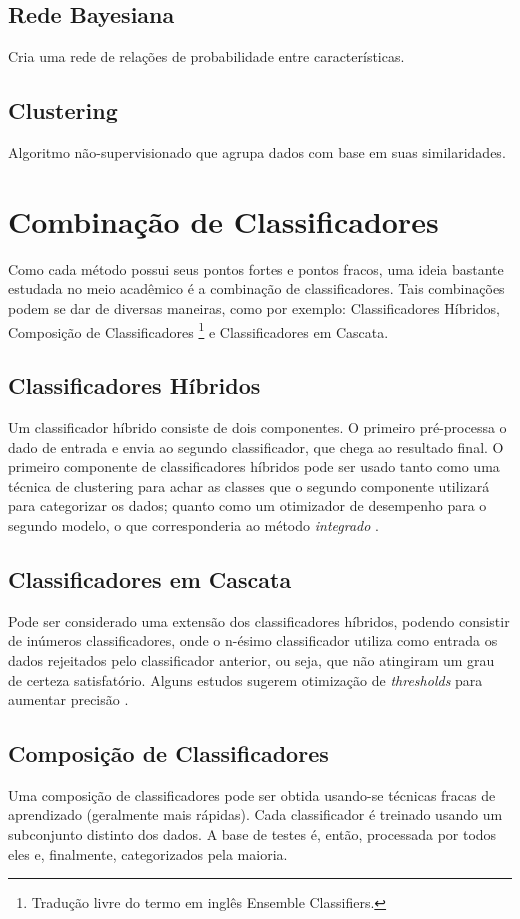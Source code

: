     \subsection{Rede Bayesiana}
        Cria uma rede de relações de probabilidade entre características.

    \subsection{Clustering}
        Algoritmo não-supervisionado que agrupa dados com base em suas similaridades.

\section{Combinação de Classificadores}
Como cada método possui seus pontos fortes e pontos fracos, uma ideia bastante estudada no meio acadêmico é a
 combinação de classificadores. Tais combinações podem se dar de diversas maneiras, como por exemplo: Classificadores
 Híbridos, Composição de Classificadores \footnote{Tradução livre do termo em inglês Ensemble Classifiers.} e
 Classificadores em Cascata.

 \subsection{Classificadores Híbridos}
    Um classificador híbrido consiste de dois componentes. O primeiro pré-processa o dado de entrada e envia ao segundo
    classificador, que chega ao resultado final. O primeiro componente de classificadores híbridos pode ser usado tanto
    como uma técnica de clustering para achar as classes que o segundo componente utilizará para categorizar os dados;
    quanto como um otimizador de desempenho para o segundo modelo, o que corresponderia ao método \textit{integrado}
    \cite{aydin09}.


 \subsection{Classificadores em Cascata}
    Pode ser considerado uma extensão dos classificadores híbridos, podendo consistir de inúmeros classificadores, onde
    o n-ésimo classificador utiliza como entrada os dados rejeitados pelo classificador anterior, ou seja, que não
    atingiram um grau de certeza satisfatório. Alguns estudos sugerem otimização de \emph{thresholds} para aumentar precisão
    \cite{oliveira05}.

 \subsection{Composição de Classificadores}
    Uma composição de classificadores pode ser obtida usando-se técnicas fracas de aprendizado
    (geralmente mais rápidas). Cada classificador é treinado usando um subconjunto distinto dos dados.
    A base de testes é, então, processada por todos eles e, finalmente, categorizados pela maioria.


